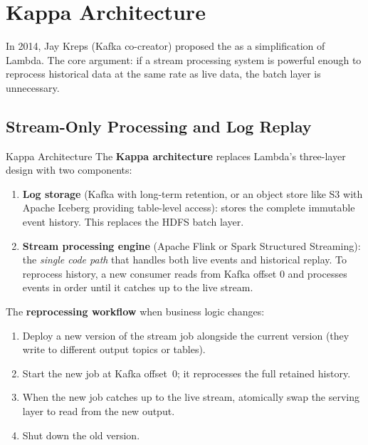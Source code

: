 \section{Kappa Architecture}
\label{sec:kappa}

In 2014, Jay Kreps (Kafka co-creator) proposed the  as a simplification of Lambda. The core argument: if a
stream processing system is powerful enough to reprocess historical data
at the same rate as live data, the batch layer is unnecessary.

\subsection{Stream-Only Processing and Log Replay}
\label{subsec:kappa-design}

\begin{defbox}{Kappa Architecture}
The \textbf{Kappa architecture} replaces Lambda's three-layer design
with two components:
\begin{enumerate}
  \item \textbf{Log storage} (Kafka with long-term retention, or an
        object store like S3 with Apache Iceberg providing table-level
        access): stores the complete immutable event history. This
        replaces the HDFS batch layer.
  \item \textbf{Stream processing engine} (Apache Flink or Spark
        Structured Streaming): the \emph{single code path} that handles
        both live events and historical replay. To reprocess history,
        a new consumer reads from Kafka offset 0 and processes events
        in order until it catches up to the live stream.
\end{enumerate}
The \textbf{reprocessing workflow} when business logic changes:
\begin{enumerate}
  \item Deploy a new version of the stream job alongside the current
        version (they write to different output topics or tables).
  \item Start the new job at Kafka offset~0; it reprocesses the full
        retained history.
  \item When the new job catches up to the live stream, atomically
        swap the serving layer to read from the new output.
  \item Shut down the old version.
\end{enumerate}
\end{defbox}

